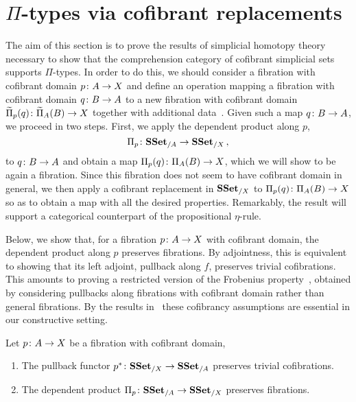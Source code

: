 \documentclass[reqno,10pt,a4paper,oneside,draft]{amsart}
\begin{document}
\section{$\Pi$-types via cofibrant replacements}
\label{sec:Pi-types}

The aim of this section is to prove the results of simplicial homotopy theory necessary to show that
the comprehension category of cofibrant simplicial sets supports $\Pi$-types. 
In order to do this, we should consider a fibration with cofibrant domain $p \colon A \to X$  and define an operation mapping a fibration with cofibrant domain $q \colon B \to A$  to a new fibration with cofibrant domain~$\widetilde{\Pi}_p(q) \colon \widetilde{\Pi}_A(B) \to X$ together with additional data~\cite{LumsdaineP:locuoc}. 
Given such a map $q \colon B \to A$, we proceed
in two steps. First, we apply the dependent product along $p$, 
\[
\Pi_p \colon \mathbf{SSet}_{/A} \to \mathbf{SSet}_{/X} \, , 
\]
to $q \colon B \to A$ and obtain a map $\Pi_p(q) \colon \Pi_A(B) \to X$, which we will show to be again a fibration. Since this fibration does not seem to have  cofibrant domain in general, we then apply a
cofibrant replacement in $\mathbf{SSet}_{/X}$ to $\Pi_p(q) \colon \Pi_A(B) \to X$ so as to obtain a map with all the desired properties. Remarkably, the result will support a categorical counterpart of the propositional
$\eta$-rule.

Below, we show that, for a fibration $p \colon A \rightarrow X$ with cofibrant domain, the dependent product along $p$ preserves fibrations. By adjointness, this is equivalent to showing that its left adjoint, \ie 
 pullback along $f$, preserves trivial cofibrations. This amounts to proving a restricted version of the Frobenius property~\cite{BergB:topsmi}, obtained by considering pullbacks along fibrations with
cofibrant domain rather than general fibrations. By the results in~\cite{coquand-non-constructivity-kan}  these cofibrancy assumptions are essential in our constructive setting.  


\begin{theorem}\label{cor:Pi_types_are_fibrant}
Let $p \colon A \rightarrow X$ be a fibration with cofibrant domain,
\begin{enumerate}[$(i)$]
\item The pullback functor $p^* \colon \mathbf{SSet}_{/X} \to \mathbf{SSet}_{/A}$ preserves trivial cofibrations.
\item The dependent product $\Pi_p \colon \mathbf{SSet}_{/A} \to \mathbf{SSet}_{/X}$ preserves  fibrations.
\end{enumerate}
\end{theorem}
\end{document}
